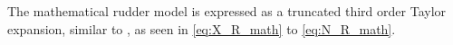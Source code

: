 The mathematical rudder model is expressed as a truncated third order Taylor expansion, similar to \citet{abkowitz_ship_1964}, as seen in \autoref{eq:X_R_math} to \autoref{eq:N_R_math}.
\begin{equation}
    \label{eq:X_R_math}
    
\end{equation}
%
\begin{equation}
    \label{eq:Y_R_math}
    
\end{equation}
%
\begin{equation}
    \label{eq:N_R_math}
    
\end{equation}